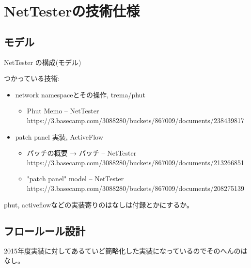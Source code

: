 
\chapter{ NetTesterの技術仕様}

\section{モデル}

NetTester の構成(モデル)

つかっている技術:
\begin{itemize}
 \item network namespaceとその操作, trema/phut
       \begin{itemize}
        \item Phut Memo – NetTester https://3.basecamp.com/3088280/buckets/867009/documents/238439817
       \end{itemize}
 \item patch panel 実装, ActiveFlow
       \begin{itemize}
        \item パッチの概要 → パッチ – NetTester https://3.basecamp.com/3088280/buckets/867009/documents/213266851
        \item "patch panel" model – NetTester https://3.basecamp.com/3088280/buckets/867009/documents/208275139
       \end{itemize}
\end{itemize}

phut, activeflowなどの実装寄りのはなしは付録とかにするか。

\section{フロールール設計}

2015年度実装に対してあるていど簡略化した実装になっているのでそのへんのはなし。

